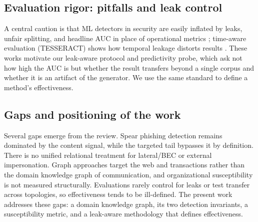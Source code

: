 \subsection{Evaluation rigor: pitfalls and leak control}
\label{sec:rw-eval}
A central caution is that ML detectors in security are easily inflated by leaks, unfair splitting, and headline
AUC in place of operational metrics \citep{arp2022dos}; time-aware evaluation (TESSERACT) shows how temporal
leakage distorts results \citep{pendlebury2019tesseract}. These works motivate our leak-aware protocol and
predictivity probe, which ask not how high the AUC is but whether the result transfers beyond a single corpus and
whether it is an artifact of the generator. We use the same standard to define a method's effectiveness.

\subsection{Gaps and positioning of the work}
\label{sec:rw-gap}
Several gaps emerge from the review. Spear phishing detection remains dominated by the content signal, while
the targeted tail bypasses it by definition. There is no unified relational treatment for lateral/BEC or external
impersonation. Graph approaches target the web and transactions rather than the domain knowledge graph of
communication, and organizational susceptibility is not measured structurally. Evaluations rarely control for leaks or test transfer across topologies, so effectiveness tends to be
ill-defined. The present work
addresses these gaps: a domain knowledge graph, its two detection invariants, a susceptibility metric, and a
leak-aware methodology that defines effectiveness.
